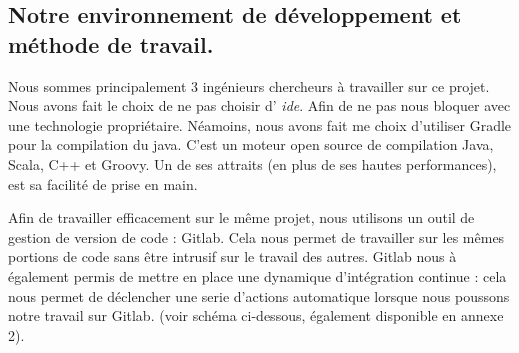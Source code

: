 \justify
\subsection{Notre environnement de développement et méthode de travail.}

Nous sommes principalement 3 ingénieurs chercheurs à travailler sur ce projet. Nous avons fait le choix de ne pas choisir d' \textit{\gls{ide}}. Afin de ne pas nous bloquer avec une technologie propriétaire. Néamoins, nous avons fait me choix d'utiliser Gradle pour la compilation du java. C'est un moteur open source de compilation Java, Scala, C++ et Groovy. Un de ses attraits (en plus de ses hautes performances), est sa facilité de prise en main.

Afin de travailler efficacement sur le même projet, nous utilisons un outil de gestion de version de code : Gitlab.
Cela nous permet de travailler sur les mêmes portions de code sans être intrusif sur le travail des autres.
Gitlab nous à également permis de mettre en place une dynamique d'intégration continue : cela nous permet de déclencher une serie d'actions automatique lorsque nous poussons notre travail sur Gitlab. (voir schéma ci-dessous, également disponible en annexe 2).

